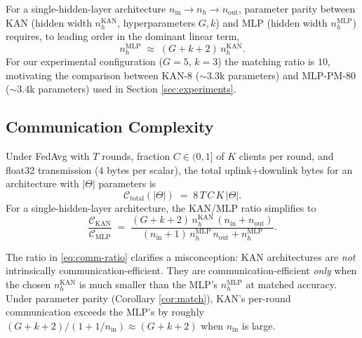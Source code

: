 \begin{corollary}\label{cor:match}
For a single-hidden-layer architecture $n_{\text{in}} \to n_h \to n_{\text{out}}$, parameter parity between KAN (hidden width $n_h^{\text{KAN}}$, hyperparameters $G, k$) and MLP (hidden width $n_h^{\text{MLP}}$) requires, to leading order in the dominant linear term,
\begin{equation}
n_h^{\text{MLP}} \;\approx\; (G + k + 2)\, n_h^{\text{KAN}}.
\end{equation}
For our experimental configuration ($G=5$, $k=3$) the matching ratio is $10$, motivating the comparison between KAN-8 ($\sim 3.3$k parameters) and MLP-PM-80 ($\sim 3.4$k parameters) used in Section \ref{sec:experiments}.
\end{corollary}

\subsection{Communication Complexity}

\begin{proposition}\label{prop:comm}
Under FedAvg with $T$ rounds, fraction $C \in (0, 1]$ of $K$ clients per round, and float32 transmission ($4$ bytes per scalar), the total uplink+downlink bytes for an architecture with $|\Theta|$ parameters is
\begin{equation}
\mathcal{C}_{\text{total}}(|\Theta|) \;=\; 8\, T\, C\, K\, |\Theta|.
\end{equation}
For a single-hidden-layer architecture, the KAN/MLP ratio simplifies to
\begin{equation}\label{eq:comm-ratio}
\frac{\mathcal{C}_{\text{KAN}}}{\mathcal{C}_{\text{MLP}}} \;=\; \frac{(G+k+2)\, n_h^{\text{KAN}}\,(n_{\text{in}}+n_{\text{out}})}{(n_{\text{in}}+1)\, n_h^{\text{MLP}}\, n_{\text{out}} + n_h^{\text{MLP}}}.
\end{equation}
\end{proposition}

\noindent The ratio in \eqref{eq:comm-ratio} clarifies a misconception: KAN architectures are \emph{not} intrinsically communication-efficient. They are communication-efficient \emph{only} when the chosen $n_h^{\text{KAN}}$ is much smaller than the MLP's $n_h^{\text{MLP}}$ at matched accuracy. Under parameter parity (Corollary \ref{cor:match}), KAN's per-round communication exceeds the MLP's by roughly $(G+k+2)/(1+1/n_{\text{in}}) \approx (G+k+2)$ when $n_{\text{in}}$ is large.


